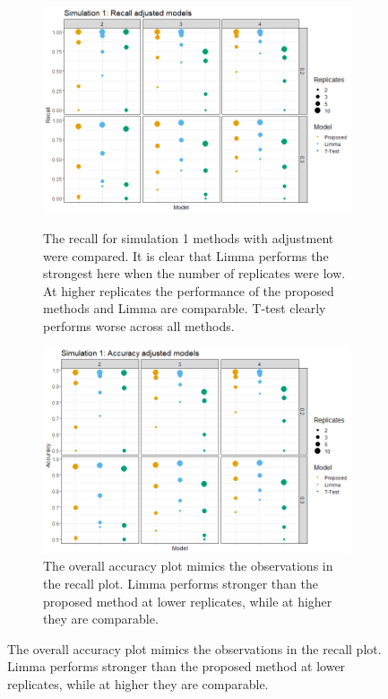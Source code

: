 \documentclass{mcp}
\begin{document}
\begin{figure}[h!]
\centering
 \begin{subfigure}{.9\textwidth}
	\includegraphics[width=.9\textwidth]{sim_new/sim1_Recall}\\
	\caption{The recall for simulation 1 methods with adjustment were compared. It is clear that Limma performs the strongest here when the number of replicates were low.  At higher replicates the performance of the proposed methods and Limma are comparable. T-test clearly performs worse across all methods.}
 \end{subfigure}
 \begin{subfigure}{.9\textwidth}
	\includegraphics[width=.9\textwidth]{sim_new/sim1_accuracy}
	\caption{The overall accuracy plot mimics the observations in the recall plot. Limma performs stronger than the proposed method at lower replicates, while at higher they are comparable.}
 \end{subfigure}
\label{fig:sim1_recall}
\end{figure}
\end{document}
